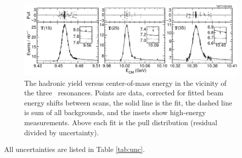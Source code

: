 \documentclass[aps,prl,superscriptaddress,showpacs,floatfix]{revtex4}
\begin{document}
\begin{figure}
  \includegraphics[width=\linewidth]{fits}
  \caption{\label{fig:fits} The hadronic yield versus center-of-mass
energy in the vicinity of the three \ups\ resonances.  Points are
data, corrected for fitted beam energy shifts between scans, the solid
line is the fit, the dashed line is sum of all backgrounds, and the
insets show high-energy measurements.  Above each fit is the pull
distribution (residual divided by uncertainty).}
\end{figure}

All uncertainties are listed in Table \ref{tab:unc}.
\end{document}
